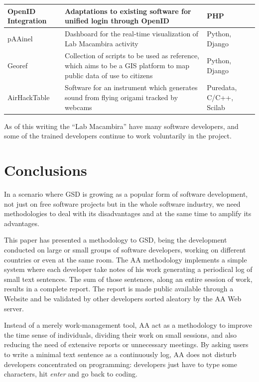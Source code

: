 \documentclass[letterpaper]{article}
\begin{document}
\begin{table}
\begin{tabular}{|l|p{5cm}|l|}
        \hline
        OpenID Integration & Adaptations to existing software for
        unified login through OpenID & PHP \\
        \hline
        pAAinel & Dashboard for the real-time visualization of Lab
        Macambira activity & Python, Django \\
        \hline
        Georef & Collection of scripts to be used as reference, which
        aims to be a GIS platform to map public data of use to
        citizens & Python, Django \\
        \hline
        AirHackTable & Software for an instrument which generates
        sound from flying origami tracked by webcams & Puredata,
        C/C++, Scilab \\
        \hline
        \end{tabular}
    \label{tabela:criados}
\end{table}

As of this writing the ``Lab Macambira'' have many software developers, and some
of the trained developers continue to work voluntarily in the project.

\section{Conclusions}
\label{conclusions}

In a scenario where GSD is growing as a popular form of software development,
not just on free software projects but in the whole software industry, we need
methodologies to deal with its disadvantages and at the same time to amplify its
advantages.

This paper has presented a methodology to GSD, being the development conducted
on large or small groups of software developers, working on different countries
or even at the same room. The AA methodology implements a simple system where
each developer take notes of his work generating a periodical log of small text
sentences. The sum of those sentences, along an entire session of work, results
in a complete report. The report is made public available through a Website and
be validated by other developers sorted aleatory by the AA Web server.

Instead of a merely work-management tool, AA act as a methodology to improve the
time sense of individuals, dividing their work on small sessions, and also
reducing the need of extensive reports or unnecessary meetings. By asking users
to write a minimal text sentence as a continuously log, AA does not disturb
developers concentrated on programming: developers just have to type some
characters, hit \textit{enter} and go back to coding.
\end{document}
